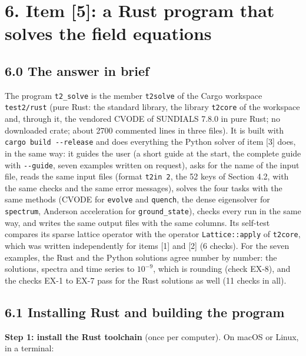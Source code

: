 \documentclass[
  10pt,
]{article}
\begin{document}
\hypertarget{item-5-a-rust-program-that-solves-the-field-equations}{%
\section{6. Item {[}5{]}: a Rust program that solves the field
equations}\label{item-5-a-rust-program-that-solves-the-field-equations}}

\hypertarget{the-answer-in-brief-4}{%
\subsection{6.0 The answer in brief}\label{the-answer-in-brief-4}}

The program \texttt{t2\_solve} is the member \texttt{t2solve} of the
Cargo workspace \texttt{test2/rust} (pure Rust: the standard library,
the library \texttt{t2core} of the workspace and, through it, the
vendored CVODE of SUNDIALS 7.8.0 in pure Rust; no downloaded crate;
about 2700 commented lines in three files). It is built with
\texttt{cargo\ build\ -\/-release} and does everything the Python solver
of item {[}3{]} does, in the same way: it guides the user (a short guide
at the start, the complete guide with \texttt{-\/-guide}, seven examples
written on request), asks for the name of the input file, reads the same
input files (format \texttt{t2in\ 2}, the 52 keys of Section 4.2, with
the same checks and the same error messages), solves the four tasks with
the same methods (CVODE for \texttt{evolve} and \texttt{quench}, the
dense eigensolver for \texttt{spectrum}, Anderson acceleration for
\texttt{ground\_state}), checks every run in the same way, and writes
the same output files with the same columns. Its self-test compares its
sparse lattice operator with the operator \texttt{Lattice::apply} of
\texttt{t2core}, which was written independently for items {[}1{]} and
{[}2{]} (6 checks). For the seven examples, the Rust and the Python
solutions agree number by number: the solutions, spectra and time series
to \(10^{-9}\), which is rounding (check EX-8), and the checks EX-1 to
EX-7 pass for the Rust solutions as well (11 checks in all).

\hypertarget{installing-rust-and-building-the-program}{%
\subsection{6.1 Installing Rust and building the
program}\label{installing-rust-and-building-the-program}}

\textbf{Step 1: install the Rust toolchain} (once per computer). On
macOS or Linux, in a terminal:
\end{document}
